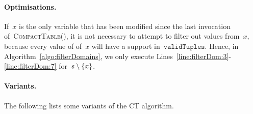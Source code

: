 \documentclass[a4paper,11pt]{article}
\newcommand{\Algoref}[1]{Algorithm~\ref{#1}}
\newcommand{\Linesref}[2]{Lines~\ref{#1}-\ref{#2}}
\newcommand{\CurrTable}{\texttt{validTuples}}
\def\CompactTable{\textsc{CompactTable}}
\numberwithin{equation}{section}
\begin{document}
\paragraph{Optimisations.} If~$x$ is the only variable
that has been modified since the last invocation of~\CompactTable(),
it is not necessary to attempt to filter out values from~$x$, because
every value of of~$x$ will have a support in~$\CurrTable$.
Hence, in \Algoref{algo:filterDomains}, we only execute
\Linesref{line:filterDom:3}{line:filterDom:7} for~$s \setminus \left\{x\right\}$.

\paragraph{Variants.}
The following lists some variants of the CT algorithm.
\newline 
\end{document}
